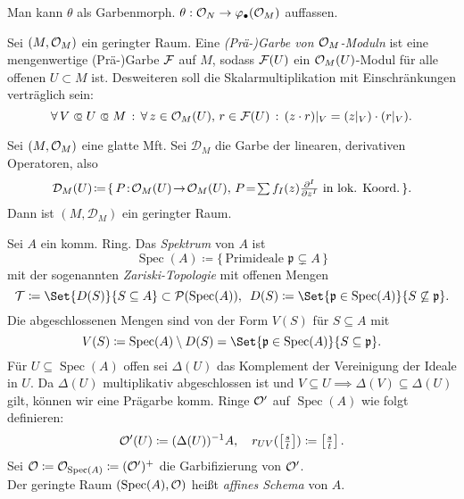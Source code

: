 \documentclass{cheat-sheet}
\newcommand{\Tau}{\mathcal{T}} %
\DeclareMathOperator{\Spec}{Spec} %
\newcommand{\Pow}{\mathcal{P}} %
\begin{document}

\begin{bem}
  Man kann $\theta$ als Garbenmorph. $\theta : \mathcal{O}_N \to \varphi_\bullet(\mathcal{O}_M)$ auffassen.
\end{bem}

\begin{defn}
  Sei $(M, \mathcal{O}_M)$ ein geringter Raum. Eine \emph{(Prä-)Garbe von $\mathcal{O}_M$-Moduln} ist eine mengenwertige (Prä-)Garbe $\mathcal{F}$ auf $M$, sodass $\mathcal{F}(U)$ ein $\mathcal{O}_M(U)$-Modul für alle offenen $U \subset M$ ist. Desweiteren soll die Skalarmultiplikation mit Einschränkungen verträglich sein:
  \[ \fa{V \opn U \opn M} \fa{z \in \O_M(U), \, r \in \Fais(U)} (z \cdot r)|_V = (z|_V) \cdot (r|_V). \]
\end{defn}

\begin{bsp}
  Sei $(M, \mathcal{O}_M)$ eine glatte Mft. Sei $\mathcal{D}_M$ die Garbe der linearen, derivativen Operatoren, also
  \[ \mathcal{D}_M(U) \!\coloneqq\! \{ \, P \!:\! \O_M(U) \!\to\! \O_M(U), \, P \!=\! \sum f_I(z) \tfrac{\partial^I}{\partial z^I} \text{ in lok. Koord.} \, \}. \]
  Dann ist $(M, \mathcal{D}_M)$ ein geringter Raum. %
\end{bsp}



\begin{defn}
  Sei $A$ ein komm. Ring. Das \emph{Spektrum} von $A$ ist
  \[ \Spec(A) \coloneqq \{ \, \text{Primideale $\mathfrak{p} \subsetneq A$} \, \} \]
  mit der sogenannten \emph{Zariski-Topologie} mit offenen Mengen 
  \[
    \Tau \coloneqq \Set{D(S)}{S \subseteq A} \subset \Pow(\Spec(A)), \enspace
    D(S) \coloneqq \Set{\mathfrak{p} \in \Spec(A)}{S \not\subseteq \mathfrak{p}}.
  \]
  Die abgeschlossenen Mengen sind von der Form $V(S)$ für $S \subseteq A$ mit
  \[
    V(S) \coloneqq \Spec(A) \setminus D(S) = \Set{\mathfrak{p} \in \Spec(A)}{S \subseteq \mathfrak{p}}.
  \]
  Für $U \subseteq \Spec(A)$ offen sei $\Delta(U)$ das Komplement der Vereinigung der Ideale in $U$.
  Da $\Delta(U)$ multiplikativ abgeschlossen ist und $V \subseteq U \!\implies\! \Delta(V) \subseteq \Delta(U)$ gilt, können wir eine Prägarbe komm. Ringe $\mathcal{O}'$ auf $\Spec(A)$ wie folgt definieren:
  \[
    \mathcal{O}'(U) \coloneqq (\Delta(U))^{-1} A, \quad
    r_{UV}(\left[\tfrac{s}{t}\right]) \coloneqq \left[\tfrac{s}{t}\right].
  \]
  Sei $\O \coloneqq \O_{\Spec(A)} \coloneqq (\O')^+$ die Garbifizierung von $\mathcal{O}'$. \\
  Der geringte Raum $(\Spec(A), \O)$ heißt \emph{affines Schema} von $A$.
\end{defn}
\end{document}
